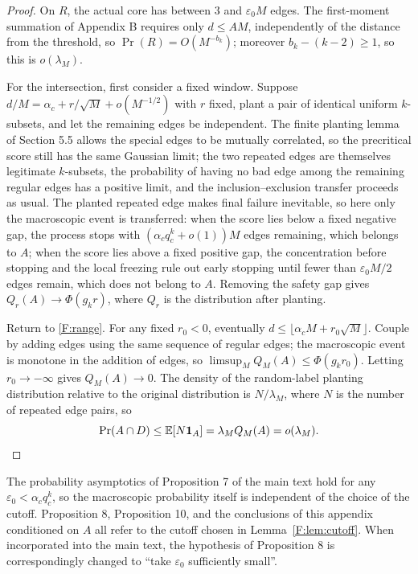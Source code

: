\documentclass[a4paper,11pt]{article}
\numberwithin{equation}{section}
\newcommand{\E}{\mathbb E}
\begin{document}
\begin{proof}
On $R$, the actual core has between $3$ and $\varepsilon_0M$ edges. The first-moment summation of Appendix B
requires only $d\le AM$, independently of the distance from the threshold, so $\Pr(R)=O(M^{-b_k})$; moreover
$b_k-(k-2)\ge1$, so this is $o(\lambda_M)$.

For the intersection, first consider a fixed window. Suppose $d/M=\alpha_c+r/\sqrt M+o(M^{-1/2})$ with $r$
fixed, plant a pair of identical uniform $k$-subsets, and let the remaining edges be independent. The finite
planting lemma of Section 5.5 allows the special edges to be mutually correlated, so the precritical score
still has the same Gaussian limit; the two repeated edges are themselves legitimate $k$-subsets, the
probability of having no bad edge among the remaining regular edges has a positive limit, and the
inclusion--exclusion transfer proceeds as usual. The planted repeated edge makes final failure inevitable, so
here only the macroscopic event is transferred: when the score lies below a fixed negative gap, the process
stops with $(\alpha_cq_c^k+o(1))M$ edges remaining, which belongs to $A$; when the score lies above a fixed
positive gap, the concentration before stopping and the local freezing rule out early stopping until fewer
than $\varepsilon_0M/2$ edges remain, which does not belong to $A$. Removing the safety gap gives
$Q_r(A)\to\Phi(g_kr)$, where $Q_r$ is the distribution after planting.

Return to \eqref{F:range}. For any fixed $r_0<0$, eventually $d\le\lfloor\alpha_cM+r_0\sqrt M\rfloor$.
Couple by adding edges using the same sequence of regular edges; the macroscopic event is monotone in the
addition of edges, so $\limsup_MQ_M(A)\le\Phi(g_kr_0)$. Letting $r_0\to-\infty$ gives $Q_M(A)\to0$. The
density of the random-label planting distribution relative to the original distribution is $N/\lambda_M$,
where $N$ is the number of repeated edge pairs, so
\[
\Pr(A\cap D)\le\E[N\mathbf1_A]=\lambda_MQ_M(A)=o(\lambda_M).\qedhere
\]
\end{proof}

The probability asymptotics of Proposition 7 of the main text hold for any $\varepsilon_0<\alpha_cq_c^k$, so
the macroscopic probability itself is independent of the choice of the cutoff. Proposition 8, Proposition 10,
and the conclusions of this appendix conditioned on $A$ all refer to the cutoff chosen in
Lemma~\ref{F:lem:cutoff}. When incorporated into the main text, the hypothesis of Proposition 8 is
correspondingly changed to ``take $\varepsilon_0$ sufficiently small''.
\end{document}
